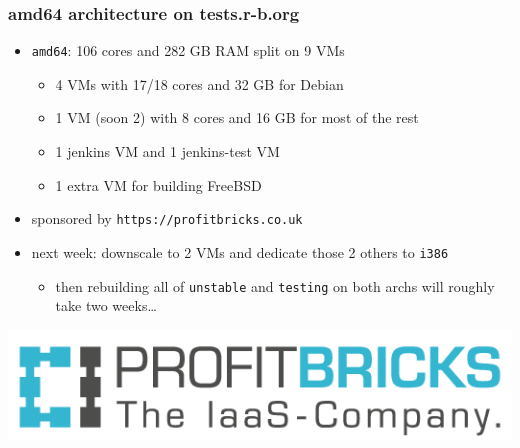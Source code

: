 \documentclass[14pt,aspectratio=169]{beamer}
\begin{document}
\begin{frame}
 \frametitle{amd64 architecture on tests.r-b.org}

 \begin{itemize}
  \item \texttt{amd64}: 106 cores and 282 GB RAM split on 9 VMs
  \begin{itemize}
   \item 4 VMs with 17/18 cores and 32 GB for Debian
   \item 1 VM (soon 2) with 8 cores and 16 GB for most of the rest
   \item 1 jenkins VM and 1 jenkins-test VM
   \item 1 extra VM for building FreeBSD
 \end{itemize}
 \item sponsored by \texttt{https://profitbricks.co.uk}
 \item<2> next week: downscale to 2 VMs and dedicate those 2 others to
 \texttt{i386}
  \begin{itemize}
   \item<2> then rebuilding all of \texttt{unstable} and \texttt{testing} on both
   archs will roughly take two weeks…
  \end{itemize}
 \end{itemize}
 \begin{center}
  \includegraphics[height=0.25\paperheight]{images/profitbricks_logo.png}
  \vfill
 \end{center}
\end{frame}
\end{document}
